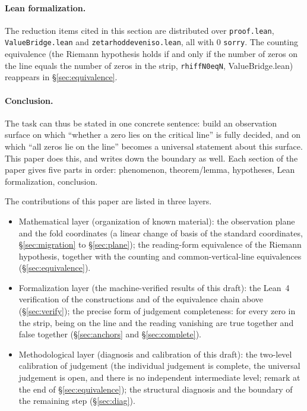 \documentclass{article}
\renewcommand{\_}{\underscoreOrig\allowbreak}
\begin{document}
\paragraph{Lean formalization.} The reduction items cited in this section
are distributed over \texttt{proof.lean}, \texttt{ValueBridge.lean} and
\texttt{zeta\_rh\_oddeven\_iso.lean}, all with 0 \texttt{sorry}. The
counting equivalence (the Riemann hypothesis holds if and only if the
number of zeros on the line equals the number of zeros in the strip,
\texttt{rh\_iff\_N0\_eq\_N}, ValueBridge.lean) reappears in
\S\ref{sec:equivalence}.

\paragraph{Conclusion.} The task can thus be stated in one concrete
sentence: build an observation surface on which ``whether a zero lies on
the critical line'' is fully decided, and on which ``all zeros lie on the
line'' becomes a universal statement about this surface. This paper does
this, and writes down the boundary as well. Each section of the paper
gives five parts in order: phenomenon, theorem/lemma, hypotheses, Lean
formalization, conclusion.

The contributions of this paper are listed in three layers.
\begin{itemize}
\item Mathematical layer (organization of known material): the
observation plane and the fold coordinates (a linear change of basis of
the standard coordinates, \S\ref{sec:migration} to \S\ref{sec:plane});
the reading-form equivalence of the Riemann hypothesis, together with
the counting and common-vertical-line equivalences
(\S\ref{sec:equivalence}).
\item Formalization layer (the machine-verified results of this draft):
the Lean~4 verification of the constructions and of the equivalence chain
above (\S\ref{sec:verify}); the precise form of judgement completeness:
for every zero in the strip, being on the line and the reading vanishing
are true together and false together (\S\ref{sec:anchors} and
\S\ref{sec:complete}).
\item Methodological layer (diagnosis and calibration of this draft): the
two-level calibration of judgement (the individual judgement is complete,
the universal judgement is open, and there is no independent intermediate
level; remark at the end of \S\ref{sec:equivalence}); the structural
diagnosis and the boundary of the remaining step (\S\ref{sec:diag}).
\end{itemize}
\end{document}
